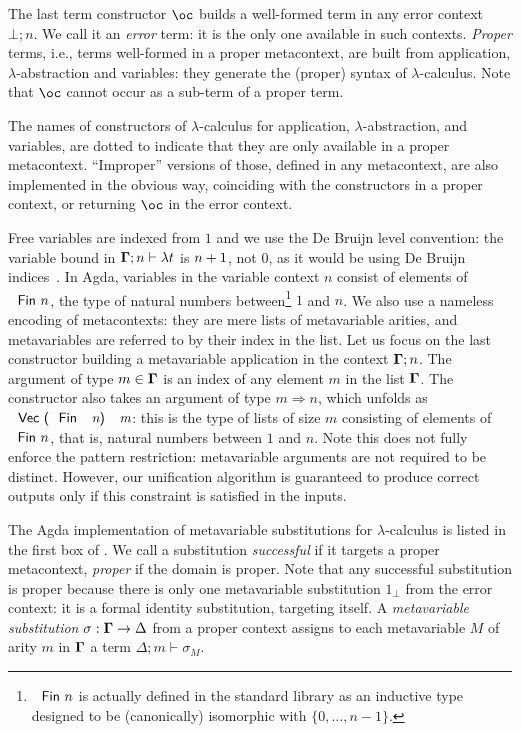 The last term constructor $\bang$ builds a well-formed term in any
error context $\bot;n$. We call it an \emph{error} term: it is the
only one available in such contexts.\emph{ Proper }terms, i.e., terms
well-formed in a proper metacontext, are built from application, $\lambda$-abstraction
and variables: they generate the (proper) syntax of $\lambda$-calculus.
Note that $\bang$ cannot occur as a sub-term of a proper term.
\begin{remark}
\label{rem:non-dotted-version} The names of constructors of $\lambda$-calculus
for application, $\lambda$-abstraction, and variables, are dotted
to indicate that they are only available in a proper metacontext.
``Improper'' versions of those, defined in any metacontext, are
also implemented in the obvious way, coinciding with the constructors
in a proper context, or returning $\bang$ in the error context.
\end{remark}
Free variables are indexed from $1$ and we use the De Bruijn level
convention: the variable bound in $\boldsymbol{\Gamma};n\vdash\lambda t$
is $n+1$, not $0$, as it would be using De Bruijn indices~\citet{DB}.
In Agda, variables in the variable context $n$ consist of elements
of $\AgdaDatatype{Fin}\ n$, the type of natural numbers between\footnote{$\AgdaDatatype{Fin}\ n$ is actually defined in the standard library
as an inductive type designed to be (canonically) isomorphic with
$\{0,\dots,n-1\}$.} $1$ and $n$. We also use a nameless encoding of metacontexts: they
are mere lists of metavariable arities, and metavariables are referred
to by their index in the list. Let us focus on the last constructor
building a metavariable application in the context $\boldsymbol{\Gamma};n$.
The argument of type $m\in\boldsymbol{\Gamma}$ is an index of any
element $m$ in the list $\boldsymbol{\Gamma}$. The constructor
also takes an argument of type $m\Rightarrow n$, which unfolds as
$\AgdaDatatype{Vec}\ \AgdaSymbol{(}\AgdaDatatype{Fin}\ \AgdaBound{n}\AgdaSymbol{)}\ \AgdaBound{m}$:
this is the type of lists of size $m$ consisting of elements of $\AgdaFunction{Fin}\ n$,
that is, natural numbers between $1$ and $n$. Note this does not
fully enforce the pattern restriction: metavariable arguments are
not required to be distinct. However, our unification algorithm is
guaranteed to produce correct outputs only if this constraint is satisfied
in the inputs.

  

The Agda implementation of metavariable substitutions for $\lambda$-calculus
is listed in the first box of . We call a substitution
\emph{successful} if it targets a proper metacontext, \emph{proper}
if the domain is proper. Note that any successful substitution is
proper because there is only one metavariable substitution $1_{\bot}$
from the error context: it is a formal identity substitution, targeting
itself. A \emph{metavariable substitution} $\sigma:\boldsymbol{\Gamma}\rightarrow\Delta$
from a proper context assigns to each metavariable $M$ of arity $m$
in $\boldsymbol{\Gamma}$ a term $\Delta;m\vdash\sigma_{M}$.

